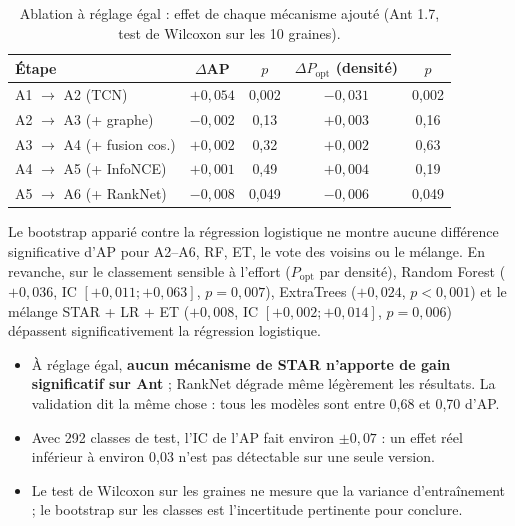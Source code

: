 \documentclass[11pt,a4paper,openany]{report}
\begin{document}
\begin{table}[H]
\centering\small
\caption{Ablation à réglage égal : effet de chaque mécanisme ajouté (Ant 1.7, test de Wilcoxon sur les 10 graines).}
\label{tab:ladder}
\begin{tabular}{lcccc}
\toprule
\textbf{Étape} & \textbf{$\Delta$AP} & \textbf{$p$} & \textbf{$\Delta P_{\mathrm{opt}}$ (densité)} & \textbf{$p$} \\
\midrule
A1 $\to$ A2 (TCN)               & $+0{,}054$ & 0,002 & $-0{,}031$ & 0,002 \\
A2 $\to$ A3 (+ graphe)          & $-0{,}002$ & 0,13  & $+0{,}003$ & 0,16 \\
A3 $\to$ A4 (+ fusion cos.)     & $+0{,}002$ & 0,32  & $+0{,}002$ & 0,63 \\
A4 $\to$ A5 (+ InfoNCE)         & $+0{,}001$ & 0,49  & $+0{,}004$ & 0,19 \\
A5 $\to$ A6 (+ RankNet)         & $-0{,}008$ & 0,049 & $-0{,}006$ & 0,049 \\
\bottomrule
\end{tabular}
\end{table}

Le bootstrap apparié contre la régression logistique ne montre aucune différence significative d'AP pour A2--A6, RF,
ET, le vote des voisins ou le mélange. En revanche, sur le classement sensible à l'effort ($P_{\mathrm{opt}}$ par
densité), Random Forest ($+0{,}036$, IC $[+0{,}011;+0{,}063]$, $p=0{,}007$), ExtraTrees ($+0{,}024$, $p<0{,}001$) et
le mélange STAR + LR + ET ($+0{,}008$, IC $[+0{,}002;+0{,}014]$, $p=0{,}006$) dépassent significativement la régression
logistique.

\begin{keybox}[Lecture]
\begin{itemize}[leftmargin=1em]
  \item À réglage égal, \textbf{aucun mécanisme de STAR n'apporte de gain significatif sur Ant} ; RankNet dégrade même
        légèrement les résultats. La validation dit la même chose : tous les modèles sont entre 0,68 et 0,70 d'AP.
  \item Avec 292 classes de test, l'IC de l'AP fait environ $\pm0{,}07$ : un effet réel inférieur à environ 0,03 n'est
        pas détectable sur une seule version.
  \item Le test de Wilcoxon sur les graines ne mesure que la variance d'entraînement ; le bootstrap sur les classes est
        l'incertitude pertinente pour conclure.
\end{itemize}
\end{keybox}
\end{document}
